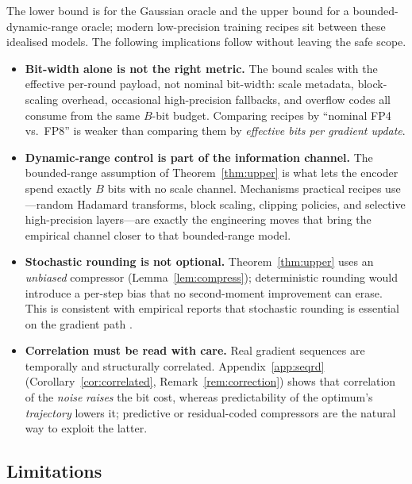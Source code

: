 \documentclass[11pt]{article}
\theoremstyle{definition}
\begin{document}
The lower bound is for the Gaussian oracle and the upper bound for a bounded-dynamic-range oracle;
modern low-precision training recipes
\citep{tseng2025mxfp4,castro2025quartet,nvidia2025nvfp4,tang2025adaptive} sit between these
idealised models. The following implications follow without leaving the safe scope.
\begin{itemize}[leftmargin=1.4em,itemsep=2pt]
  \item \textbf{Bit-width alone is not the right metric.} The bound scales with the effective
        per-round payload, not nominal bit-width: scale metadata, block-scaling overhead,
        occasional high-precision fallbacks, and overflow codes all consume from the same $B$-bit
        budget. Comparing recipes by ``nominal FP4 vs.\ FP8'' is weaker than comparing them by
        \emph{effective bits per gradient update}.
  \item \textbf{Dynamic-range control is part of the information channel.} The bounded-range
        assumption of Theorem~\ref{thm:upper} is what lets the encoder spend exactly $B$ bits
        with no scale channel. Mechanisms practical recipes use---random Hadamard transforms,
        block scaling, clipping policies, and selective high-precision layers---are exactly the
        engineering moves that bring the empirical channel closer to that bounded-range model.
  \item \textbf{Stochastic rounding is not optional.} Theorem~\ref{thm:upper} uses an
        \emph{unbiased} compressor (Lemma~\ref{lem:compress}); deterministic rounding would
        introduce a per-step bias that no second-moment improvement can erase. This is consistent
        with empirical reports that stochastic rounding is essential on the gradient path
        \citep{tseng2025mxfp4,nvidia2025nvfp4}.
  \item \textbf{Correlation must be read with care.} Real gradient sequences are temporally and
        structurally correlated. Appendix~\ref{app:seqrd}
        (Corollary~\ref{cor:correlated}, Remark~\ref{rem:correction}) shows that correlation of the
        \emph{noise} \emph{raises} the bit cost, whereas predictability of the optimum's
        \emph{trajectory} lowers it; predictive or residual-coded compressors are the natural way to
        exploit the latter.
\end{itemize}

\subsection{Limitations}
\label{sec:discussion:lim}
\end{document}
